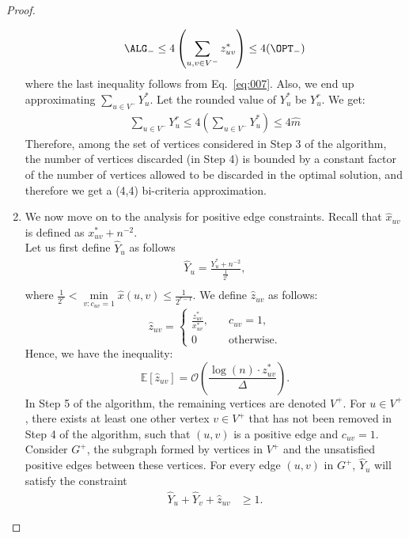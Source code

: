 \begin{proof}
\begin{enumerate}
\begin{equation*}
	\ALG_- \leq 4 \left( \sum_{u,v \in V^-} z^*_{uv} \right) \leq 4(\OPT_-)
	\end{equation*}
	where the last inequality follows from Eq.~\eqref{eq:007}.
	Also, we end up approximating $\sum_{u\in V^-}Y_u^*$. Let the rounded value of $Y_u^*$ be $Y_u^r$. We get:
	\begin{align*}
	    \sum_{u\in V^-} Y_u^r \leq 4(\sum_{u\in V^-} Y_u^*) \leq 4\hat{m}
	\end{align*}
	Therefore, among the set of vertices considered in Step 3 of the algorithm, the number of vertices discarded (in Step 4) is bounded by a constant factor of the number of vertices allowed to be discarded in the optimal solution, and therefore we get a (4,4) bi-criteria approximation.
	\item We now move on to the analysis for positive edge constraints. Recall that $\hat{x}_{uv}$ is defined as $x_{uv}^* + n^{-2}$.\\
	Let us first define $\hat{Y}_u$ as follows
	\begin{align*}
	    \hat{Y}_{u}=\frac{Y_u^* + n^{-2}}{\frac{1}{2^r}},\\
	\end{align*}
	where $\frac{1}{2^{r}} < \underset{v : c_{uv} = 1}{\min} \hat{x} (u,v) \le \frac{1}{2^{r-1}}$.
	We define $\hat{z}_{uv}$ as follows:
	\begin{equation*}
	    \hat{z}_{uv} = 
	    \begin{cases}
	    \frac{z_{uv}^*}{x^*_{uv}}, \quad &c_{uv}=1,\\
	    0 &\text{otherwise}.
	    \end{cases}
	\end{equation*}
    Hence, we have the inequality:
    \begin{equation*}
        \mathbb{E} [\hat{z}_{uv}] = \mathcal{O} \left(\frac{ \log (n)\cdot z^*_{uv}}{\Delta} \right).
    \end{equation*}
	In Step 5 of the algorithm, the remaining vertices are denoted $V^+$. For $u \in V^+$, there exists at least one other vertex $v \in V^+$ that has not been removed in Step 4 of the algorithm, such that $(u,v)$ is a positive edge and $c_{uv} = 1$. Consider $G^+$, the subgraph formed by vertices in $V^+$ and the unsatisfied positive edges between these vertices. For every edge $(u,v)$ in $G^+$, $\hat{Y}_u$ will satisfy the constraint
	\begin{align} \label{eq:IP3normalized}
	    \hat{Y}_{u} + \hat{Y}_{v} + \hat{z}_{uv} &\geq 1.

\end{align}
\end{enumerate}
\end{proof}
